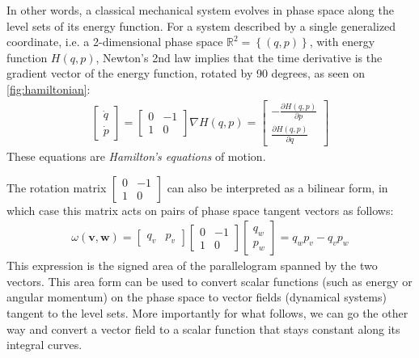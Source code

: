 \documentclass[final,3p,mathptmx]{elsarticle}
\begin{document}
In other words, a classical mechanical system evolves in phase space along the level sets of its energy function. For a system described by a single generalized coordinate, i.e. a 2-dimensional phase space $\mathbb{R}^{2} = \left\lbrace(q,p) \right\rbrace$, with energy function $H(q,p)$, Newton's 2nd law implies that the time derivative is the gradient vector of the energy function, rotated by 90 degrees, as seen on \autoref{fig:hamiltonian}:
\begin{align}
\begin{bmatrix}
\dot{q} \\
\dot{p}
\end{bmatrix}
=
\begin{bmatrix}
0 & -1 \\
1 & 0
\end{bmatrix} \nabla H(q,p) = 
\begin{bmatrix}
-\frac{\partial H(q,p)}{\partial p} \\
\frac{\partial H(q,p)}{\partial q}
\end{bmatrix} 
\end{align}
These equations are \emph{Hamilton's equations} of motion.

The rotation matrix $\begin{bmatrix}
0 & -1 \\
1 & 0
\end{bmatrix}$ can also be interpreted as a bilinear form, in which case this matrix acts on pairs of phase space tangent vectors as follows:
\begin{align}
\omega(\mathbf{v},\mathbf{w}) = \begin{bmatrix}
q_{v} & p_{v}
\end{bmatrix}\begin{bmatrix}
0 & -1 \\
1 & 0
\end{bmatrix}\begin{bmatrix}
q_{w} \\
p_{w}
\end{bmatrix} = q_{w}p_{v} - q_{v}p_{w}
\end{align}
This expression is the signed area of the parallelogram spanned by the two vectors. This area form can be used to convert scalar functions (such as energy or angular momentum) on the phase space to vector fields (dynamical systems) tangent to the level sets. More importantly for what follows, we can go the other way and convert a vector field to a scalar function that stays constant along its integral curves.
\end{document}
